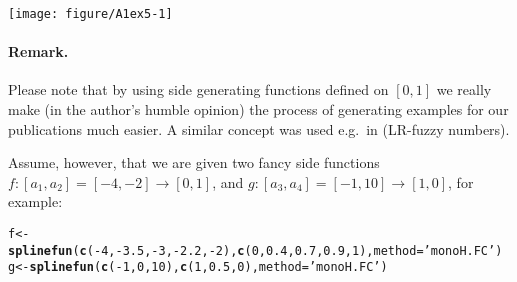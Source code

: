 \documentclass[11pt]{article}\usepackage[]{graphicx}\usepackage[]{color}
\makeatletter
\newcommand{\hlnum}[1]{\textcolor[rgb]{0.686,0.059,0.569}{#1}}%
\newcommand{\hlstr}[1]{\textcolor[rgb]{0.192,0.494,0.8}{#1}}%
\newcommand{\hlopt}[1]{\textcolor[rgb]{0,0,0}{#1}}%
\newcommand{\hlstd}[1]{\textcolor[rgb]{0.345,0.345,0.345}{#1}}%
\newcommand{\hlkwb}[1]{\textcolor[rgb]{0.69,0.353,0.396}{#1}}%
\newcommand{\hlkwc}[1]{\textcolor[rgb]{0.333,0.667,0.333}{#1}}%
\newcommand{\hlkwd}[1]{\textcolor[rgb]{0.737,0.353,0.396}{\textbf{#1}}}%
\newenvironment{kframe}{%
 \def\at@end@of@kframe{}%
 \ifinner\ifhmode%
  \def\at@end@of@kframe{\end{minipage}}%
  \begin{minipage}{\columnwidth}%
 \fi\fi%
 \def\FrameCommand##1{\hskip\@totalleftmargin \hskip-\fboxsep
 \colorbox{shadecolor}{##1}\hskip-\fboxsep
     \hskip-\linewidth \hskip-\@totalleftmargin \hskip\columnwidth}%
 \MakeFramed {\advance\hsize-\width
   \@totalleftmargin\z@ \linewidth\hsize
   \@setminipage}}%
 {\par\unskip\endMakeFramed%
 \at@end@of@kframe}
\newenvironment{knitrout}{}{} %
\makeatother
\begin{document}
\begin{center}
\begin{knitrout}\small
{}\color{fgcolor}

{\centering \texttt{[image: figure/A1ex5-1]} 

}



\end{knitrout}
\end{center}







\paragraph{Remark.}
Please note that by using side generating functions defined on $[0,1]$
we really make (in the author's humble opinion) the process of generating
examples for our publications much easier.
A similar concept was used e.g.~in \cite{StefaniniSorini2009:eusflat}
(LR-fuzzy numbers).

Assume, however, that we are given two fancy side
functions $f: [a_1,a_2]=[-4,-2]\to[0,1]$,
and $g: [a_3,a_4]=[-1,10]\to[1,0]$,
for example:

\begin{knitrout}\small
{}\color{fgcolor}\begin{kframe}
\begin{alltt}
\hlstd{f} \hlkwb{<-} \hlkwd{splinefun}\hlstd{(}\hlkwd{c}\hlstd{(}\hlopt{-}\hlnum{4}\hlstd{,}\hlopt{-}\hlnum{3.5}\hlstd{,}\hlopt{-}\hlnum{3}\hlstd{,}\hlopt{-}\hlnum{2.2}\hlstd{,}\hlopt{-}\hlnum{2}\hlstd{),} \hlkwd{c}\hlstd{(}\hlnum{0}\hlstd{,}\hlnum{0.4}\hlstd{,}\hlnum{0.7}\hlstd{,}\hlnum{0.9}\hlstd{,}\hlnum{1}\hlstd{),} \hlkwc{method}\hlstd{=}\hlstr{'monoH.FC'}\hlstd{)}
\hlstd{g} \hlkwb{<-} \hlkwd{splinefun}\hlstd{(}\hlkwd{c}\hlstd{(}\hlopt{-}\hlnum{1}\hlstd{,}\hlnum{0}\hlstd{,}\hlnum{10}\hlstd{),} \hlkwd{c}\hlstd{(}\hlnum{1}\hlstd{,}\hlnum{0.5}\hlstd{,}\hlnum{0}\hlstd{),} \hlkwc{method}\hlstd{=}\hlstr{'monoH.FC'}\hlstd{)}
\end{alltt}
\end{kframe}
\end{knitrout}
\end{document}
